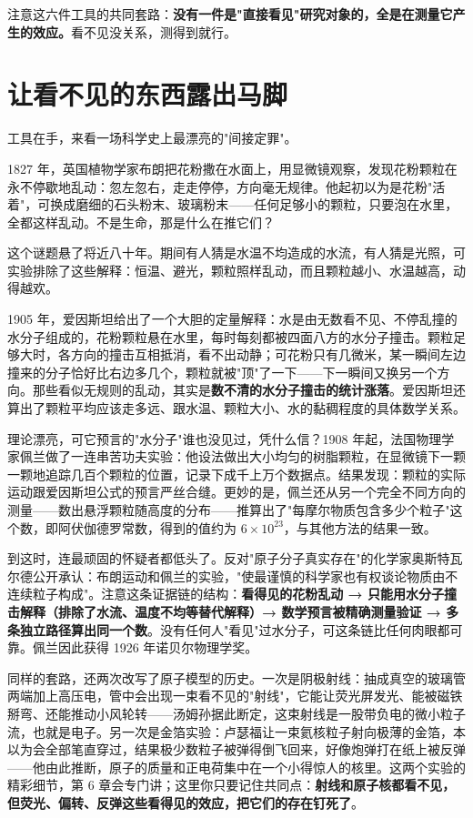 注意这六件工具的共同套路：\textbf{没有一件是"直接看见"研究对象的，全是在测量它产生的效应。}看不见没关系，测得到就行。

\section{让看不见的东西露出马脚}

工具在手，来看一场科学史上最漂亮的"间接定罪"。

\begin{zhengju}
1827 年，英国植物学家布朗把花粉撒在水面上，用显微镜观察，发现花粉颗粒在永不停歇地乱动：忽左忽右，走走停停，方向毫无规律。他起初以为是花粉"活着"，可换成磨细的石头粉末、玻璃粉末——任何足够小的颗粒，只要泡在水里，全都这样乱动。不是生命，那是什么在推它们？

这个谜题悬了将近八十年。期间有人猜是水温不均造成的水流，有人猜是光照，可实验排除了这些解释：恒温、避光，颗粒照样乱动，而且颗粒越小、水温越高，动得越欢。

1905 年，爱因斯坦给出了一个大胆的定量解释：水是由无数看不见、不停乱撞的水分子组成的，花粉颗粒悬在水里，每时每刻都被四面八方的水分子撞击。颗粒足够大时，各方向的撞击互相抵消，看不出动静；可花粉只有几微米，某一瞬间左边撞来的分子恰好比右边多几个，颗粒就被"顶"了一下——下一瞬间又换另一个方向。那些看似无规则的乱动，其实是\textbf{数不清的水分子撞击的统计涨落}。爱因斯坦还算出了颗粒平均应该走多远、跟水温、颗粒大小、水的黏稠程度的具体数学关系。

理论漂亮，可它预言的"水分子"谁也没见过，凭什么信？1908 年起，法国物理学家佩兰做了一连串苦功夫实验：他设法做出大小均匀的树脂颗粒，在显微镜下一颗一颗地追踪几百个颗粒的位置，记录下成千上万个数据点。结果发现：颗粒的实际运动跟爱因斯坦公式的预言严丝合缝。更妙的是，佩兰还从另一个完全不同方向的测量——数出悬浮颗粒随高度的分布——推算出了"每摩尔物质包含多少个粒子"这个数，即阿伏伽德罗常数，得到的值约为 $6\times 10^{23}$，与其他方法的结果一致。

到这时，连最顽固的怀疑者都低头了。反对"原子分子真实存在"的化学家奥斯特瓦尔德公开承认：布朗运动和佩兰的实验，"使最谨慎的科学家也有权谈论物质由不连续粒子构成"。注意这条证据链的结构：\textbf{看得见的花粉乱动 → 只能用水分子撞击解释（排除了水流、温度不均等替代解释）→ 数学预言被精确测量验证 → 多条独立路径算出同一个数}。没有任何人"看见"过水分子，可这条链比任何肉眼都可靠。佩兰因此获得 1926 年诺贝尔物理学奖。
\end{zhengju}

同样的套路，还两次改写了原子模型的历史。一次是阴极射线：抽成真空的玻璃管两端加上高压电，管中会出现一束看不见的"射线"，它能让荧光屏发光、能被磁铁掰弯、还能推动小风轮转——汤姆孙据此断定，这束射线是一股带负电的微小粒子流，也就是电子。另一次是金箔实验：卢瑟福让一束氦核粒子射向极薄的金箔，本以为会全部笔直穿过，结果极少数粒子被弹得倒飞回来，好像炮弹打在纸上被反弹——他由此推断，原子的质量和正电荷集中在一个小得惊人的核里。这两个实验的精彩细节，第 6 章会专门讲；这里你只要记住共同点：\textbf{射线和原子核都看不见，但荧光、偏转、反弹这些看得见的效应，把它们的存在钉死了}。

